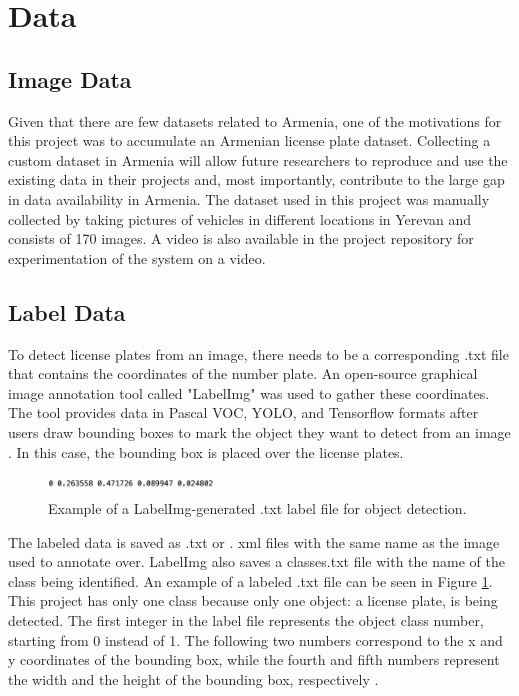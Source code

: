 \documentclass[conference]{IEEEtran}
\begin{document}
\section{Data}
\subsection{Image Data}

Given that there are few datasets related to Armenia, one of the motivations for this project was to accumulate an Armenian license plate dataset. Collecting a custom dataset in Armenia will allow future researchers to reproduce and use the existing data in their projects and, most importantly, contribute to the large gap in data availability in Armenia. The dataset used in this project was manually collected by taking pictures of vehicles in different locations in Yerevan and consists of 170 images. A video is also available in the project repository for experimentation of the system on a video.  

\subsection{Label Data}

To detect license plates from an image, there needs to be a corresponding .txt file that contains the coordinates of the number plate. An open-source graphical image annotation tool called "LabelImg" was used to gather these coordinates. The tool provides data in Pascal VOC, YOLO, and Tensorflow formats after users draw bounding boxes to mark the object they want to detect from an image \cite{b1}. In this case, the bounding box is placed over the license plates.

\begin{figure}[h]
    \centering
    \includegraphics[width=0.4\textwidth]{images/Picture1.png}
    \caption{Example of a LabelImg-generated .txt label file for object detection.}
    \label{fig:Picture1}
\end{figure}

The labeled data is saved as .txt or . xml files with the same name as the image used to annotate over. LabelImg also saves a classes.txt file with the name of the class being identified. An example of a labeled .txt file can be seen in Figure \ref{fig:Picture1}. This project has only one class because only one object: a license plate, is being detected. The first integer in the label file represents the object class number, starting from 0 instead of 1. The following two numbers correspond to the x and y coordinates of the bounding box, while the fourth and fifth numbers represent the width and the height of the bounding box, respectively \cite{b1}.
\end{document}
